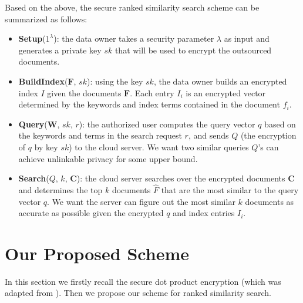 \documentclass{article}
\begin{document}
Based on the above, the secure ranked similarity search scheme can be summarized as follows:
\begin{itemize}
\item \textbf{Setup}($1^\lambda$): the data owner takes a security parameter $\lambda$ as input and generates a private key $sk$ that will be used to encrypt the outsourced documents.
\item \textbf{BuildIndex}($\mathbf{F}$, $sk$): using the key $sk$, the data owner builds an encrypted index $I$ given the documents $\mathbf{F}$. Each entry $I_i$ is an encrypted vector determined by the keywords and index terms contained in the document $f_i$.
\item \textbf{Query}($\mathbf{W}$, $sk$, $r$): the authorized user computes the query vector $q$ based on the keywords and terms in the search request $r$, and sends $Q$ (the encryption of $q$ by key $sk$) to the cloud server. We want two similar queries $Q$'s can achieve unlinkable privacy for some upper bound.
\item \textbf{Search}($Q$, $k$, $\mathbf{C}$): the cloud server searches over the encrypted documents $\mathbf{C}$ and determines the top $k$ documents $\hat{F}$ that are the most similar to the query vector $q$. We want the server can figure out the most similar $k$ documents as accurate as possible given the encrypted $q$ and index entries $I_i$.
\end{itemize}

\section{Our Proposed Scheme}
In this section we firstly recall the secure dot product encryption \cite{Cao14} (which was adapted from \cite{Wong09}). Then we propose our scheme for ranked similarity search.
\end{document}
